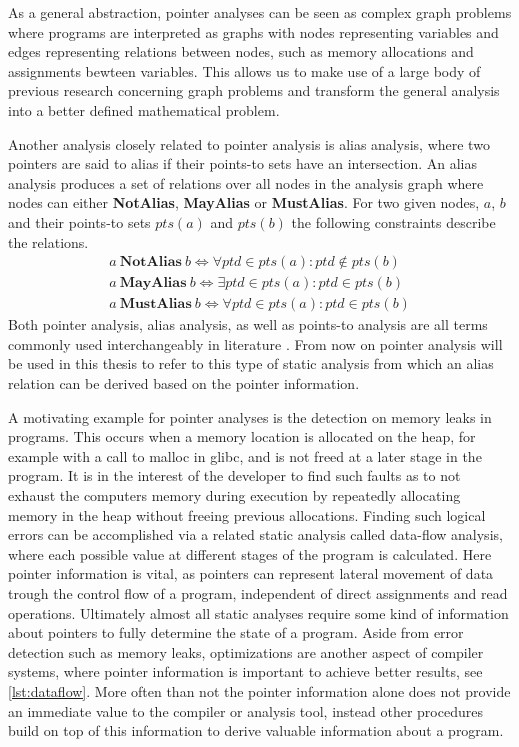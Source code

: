 As a general abstraction, pointer analyses can be seen as complex graph problems where programs are interpreted as graphs with nodes representing variables and edges representing relations between nodes, such as memory allocations and assignments bewteen variables.
This allows us to make use of a large body of previous research concerning graph problems and transform the general analysis into a better defined mathematical problem.

Another analysis closely related to pointer analysis is alias analysis, where two pointers are said to alias if their points-to sets have an intersection. An alias analysis produces a set of relations over all nodes in the analysis graph where nodes can either \textbf{NotAlias}, \textbf{MayAlias} or \textbf{MustAlias}.
For two given nodes, $a$, $b$ and their points-to sets $pts(a)$ and $pts(b)$ the following constraints describe the relations.
\begin{align}
    a\ \textbf{NotAlias}\ b \iff \forall ptd \in pts(a) \colon ptd \notin pts(b)\label{eq:alias1}\\
    a\ \textbf{MayAlias}\ b \iff \exists ptd \in pts(a) \colon ptd \in pts(b)\label{eq:alias2}\\
    a\ \textbf{MustAlias}\ b \iff \forall ptd \in pts(a) \colon ptd \in pts(b)
\end{align}
Both pointer analysis, alias analysis, as well as points-to analysis are all terms commonly used interchangeably in literature \cite{hind2001pointer}. From now on pointer analysis will be used in this thesis to refer to this type of static analysis from which an alias relation can be derived based on the pointer information.

A motivating example for pointer analyses is the detection on memory leaks in programs.
This occurs when a memory location is allocated on the heap, for example with a call to malloc in glibc, and is not freed at a later stage in the program.
It is in the interest of the developer to find such faults as to not exhaust the computers memory during execution by repeatedly allocating memory in the heap without freeing previous allocations.
Finding such logical errors can be accomplished via a related static analysis called data-flow analysis, where each possible value at different stages of the program is calculated. Here pointer information is vital, as pointers can represent lateral movement of data trough the control flow of a program, independent of direct assignments and read operations. Ultimately almost all static analyses require some kind of information about pointers to fully determine the state of a program.
Aside from error detection such as memory leaks, optimizations are another aspect of compiler systems, where pointer information is important to achieve better results, see \autoref{lst:dataflow}.
More often than not the pointer information alone does not provide an immediate value to the compiler or analysis tool, instead other procedures build on top of this information to derive valuable information about a program.

